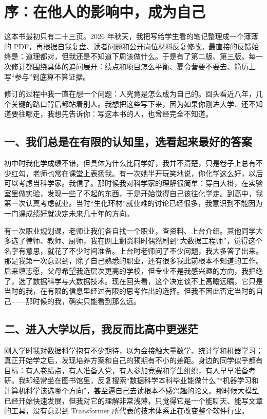 \documentclass[UTF8,zihao=5,openany]{ctexbook}
\begin{document}
\clearpage
\chapter*{序：在他人的影响中，成为自己}

这本书最初只有二十三页。2026 年秋天，我把写给学生看的笔记整理成一个薄薄的 PDF，再根据自我复盘、读者问题和公开岗位材料反复修改。最直接的反馈始终是：道理都对，但我还是不知道下周该做什么。于是有了第二版、第三版。每一次修订都围绕具体的追问展开：绩点和项目怎么平衡、夏令营要不要去、简历上写“参与”到底算不算证据。

修订的过程中我一直在想一个问题：人究竟是怎么成为自己的。回头看近八年，几个关键的路口背后都站着别人。我想把这些写下来，因为如果你刚进大学、还不知道要往哪走，我想先告诉你：写这本书的人，也曾经完全不知道。

\section*{一、我们总是在有限的认知里，选看起来最好的答案}

初中时我化学成绩不错，但具体为什么比同学好，我并不清楚，只是卷子上总有不少红勾，老师也常在课堂上表扬我。有一次她半开玩笑地说，你化学这么好，以后可以考虑当科学家。我信了。那时候我对科学家的理解很简单：穿白大褂，在实验室里做实验，发现一些了不起的东西，于是开始觉得自己该往化学走。到高中，我第一次认真考虑就业。当时“生化环材”就业难的讨论已经很多，我意识到不能因为一门课成绩好就决定未来几十年的方向。

有一次职业规划课，老师让我们各自找一个职业，查资料、上台介绍。其他同学大多选了律师、教师、厨师，我在网上翻资料时偶然刷到“大数据工程师”，觉得这个名字有意思，就花了不少时间准备。上台时老师问了不少问题，我大多答了出来。那是我第一次意识到，除了自己熟悉的职业，还有很多我此前根本不知道的工作。后来填志愿，父母希望我选层次更高的学校，但专业不是我感兴趣的方向，我拒绝了，选了数据科学与大数据技术。现在回头看，这个决定谈不上高瞻远瞩，它只是当时的我，在有限的信息里经过有限的思考作出的选择。但我不因此否定当时的自己——那时候的我，确实只能看到那么远。

\section*{二、进入大学以后，我反而比高中更迷茫}

刚入学时我对数据科学抱有不少期待，以为会接触大量数学、统计学和机器学习；真正开始学之后，发现培养方案和自己的预期有不小的差距。身边的同学似乎都有目标：有人卷绩点，有人准备入党，有人参加竞赛和学生组织，有人早早准备考研。我却经常坐在图书馆里，反复搜索“数据科学本科毕业能做什么”“机器学习和计算机科学该选哪个方向”，甚至逼自己去读根本不感兴趣的论文。那时候大模型已经开始快速发展，但我对它的理解非常浅薄，只觉得它是一个能聊天、能写文章的工具，没有意识到 Transformer 所代表的技术体系正在改变整个软件行业。
\end{document}
